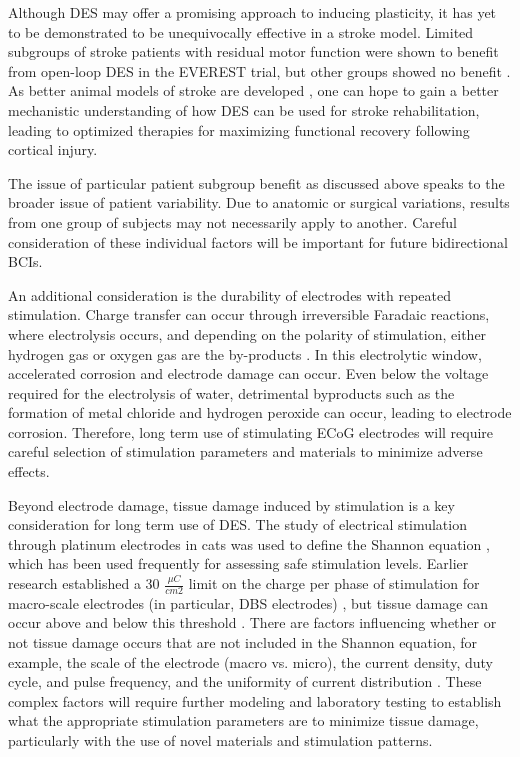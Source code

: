 Although DES may offer a promising approach to inducing plasticity, it has yet to be demonstrated to be unequivocally effective in a stroke model. Limited subgroups of stroke patients with residual motor function were shown to benefit from open-loop DES in the EVEREST trial, but other groups showed no benefit \cite{Levy2016a}. As better animal models of stroke are developed \cite{Sommer2017}, one can hope to gain a better mechanistic understanding of how DES can be used for stroke rehabilitation, leading to optimized therapies for maximizing functional recovery following cortical injury. 

The issue of particular patient subgroup benefit as discussed above speaks to the broader issue of patient variability. Due to anatomic or surgical variations, results from one group of subjects may not necessarily apply to another. Careful consideration of these individual factors will be important for future bidirectional BCIs. 

An additional consideration is the durability of electrodes with repeated stimulation. Charge transfer can occur through irreversible Faradaic reactions, where electrolysis occurs, and depending on the polarity of stimulation, either hydrogen gas or oxygen gas are the by-products \cite{Merrill2005}. In this electrolytic window, accelerated corrosion and electrode damage can occur. Even below the voltage required for the electrolysis of water, detrimental byproducts such as the formation of metal chloride and hydrogen peroxide can occur, leading to electrode corrosion. Therefore, long term use of stimulating ECoG electrodes will require careful selection of stimulation parameters and materials to minimize adverse effects. 

Beyond electrode damage, tissue damage induced by stimulation is a key consideration for long term use of DES. The study of electrical stimulation through platinum electrodes in cats \cite{McCreery1990} was used to define the Shannon equation \cite{Shannon1992}, which has been used frequently for assessing safe stimulation levels. Earlier research established a 30 $ \frac{\mu C}{cm2} $ limit on the charge per phase of stimulation for macro-scale electrodes (in particular, DBS electrodes) \cite{Kuncel2004}, but tissue damage can occur above and below this threshold \cite{Cogan2016b}. There are factors influencing whether or not tissue damage occurs that are not included in the Shannon equation, for example, the scale of the electrode (macro vs. micro), the current density, duty cycle, and pulse frequency, and the uniformity of current distribution \cite{Cogan2016b}. These complex factors will require further modeling and laboratory testing to establish what the appropriate stimulation parameters are to minimize tissue damage, particularly with the use of novel materials and stimulation patterns. 

